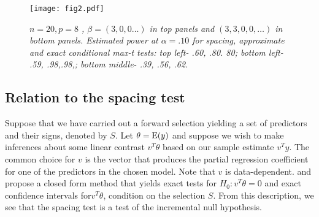 \documentclass{article}
\begin{document}
\begin{figure}[hbtp]
\centering
\texttt{[image: fig2.pdf]}  
\caption{\em $n=20, p=8$ ,  $\beta=(3,0,0\ldots)$ in top panels and $(3,3,0,0,\ldots)$ in bottom panels.
Estimated power at $\alpha=.10$ for spacing, approximate and exact conditional max-t tests: top left- .60, .80. 80;  bottom left- .59, .98,.98,; bottom middle-
.39, .56, .62. }
\label{fig:fig2}
\end{figure}

\subsection{Relation to the spacing test} 
\label{sec:spacing}
Suppose that we have carried out a forward selection  yielding a set of predictors and their signs, denoted by $S$.
Let $\theta={\rm E}(y)$ and suppose we wish to make inferences about some linear contrast $v^T \theta$ based on
our sample estimate $v^T y$. The common choice for $v$ is the vector that produces the partial regression coefficient for one of the predictors
in the chosen model. Note that $v$ is data-dependent.
\citet{TLTT2014} and \citet{LT2014} propose a closed form method that yields exact tests for $H_0: v^T\theta=0$ and exact confidence intervals
for$v^T\theta$, condition on the selection $S$.
From this description, we see that the spacing test is a test of the incremental null hypothesis.
\end{document}
